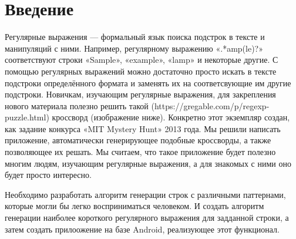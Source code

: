 \documentclass[12pt]{article}
\begin{document}
\section{Введение}
Регулярные выражения — формальный язык поиска подстрок в тексте и манипуляций с ними. Например, регулярному выражению «.*amp(le)?» соответствуют строки «Sample», «example», «lamp» и некоторые другие. С помощью регулярных выражений можно достаточно просто искать в тексте подстроки определённого формата и заменять их на соответсвующие им другие подстроки. Новичкам, изучающим регулярные выражения, для закрепления нового материала полезно решить такой (https://gregable.com/p/regexp-puzzle.html) кроссворд (изображение ниже). Конкретно этот экземпляр создан, как задание конкурса «MIT Mystery Hunt» 2013 года. Мы решили написать приложение, автоматически генерирующее подобные кроссворды, а также позволяющее их решать. Мы считаем, что такое приложение будет полезно многим людям, изучающим регулярные выражения, а для знакомых с ними оно будет просто интересно.

    \newpage %
     Необходимо разработать алгоритм генерации строк с различными паттернами, которые могли бы легко восприниматься человеком.
     И создать алгоритм генерации наиболее короткого регулярного выражения для задданной строки, а затем создать прилоожение на базе Android, реализующее этот функционал.


    \newpage %
\end{document}
